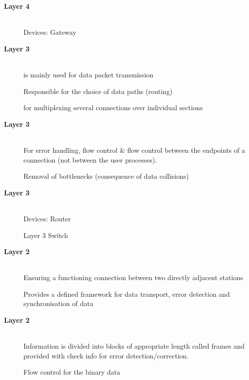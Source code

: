 \begin{description}
\os{\newpage}\item[{\rot\bf  Layer 4 }]~\\[-3ex]

\bi
  \ite Devices:
\ei
\bi
 \ite Gateway
 \ei



\os{\newpage}\item[{\rot\bf  Layer 3 }]~\\[-3ex]

\bi
  \ite is mainly used for data packet
transmission

  \ite Responsible for the choice of data
paths (routing)

  \ite for multiplexing several connections over individual sections

\ei


\os{\newpage}\item[{\rot\bf  Layer 3 }]~\\[-3ex]

\bi
  \ite For error handling, flow control \& flow control between the endpoints of a connection (not between the user processes).

  \ite Removal of bottlenecks (consequence of data
collisions)

\ei


\os{\newpage}\item[{\rot\bf  Layer 3 }]~\\[-3ex]

\bi
  \ite Devices:
\ei
\bi
 \ite Router
 \ei

\bi
 \ite Layer 3 Switch
 \ei



\os{\newpage}\item[{\rot\bf  Layer 2 }]~\\[-3ex]

\bi
  \ite Ensuring a functioning connection between two directly adjacent stations

  \ite Provides a defined framework for data transport, error detection and synchronisation of data

\ei


\os{\newpage}\item[{\rot\bf  Layer 2 }]~\\[-3ex]

\bi
  \ite Information is divided into blocks of appropriate length called frames and provided with check info for error detection/correction.

  \ite Flow control for the binary data


\end{description}
